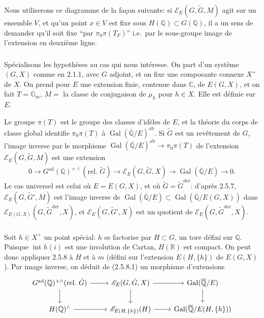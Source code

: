 \documentclass[12pt,a4paper]{article}
\theoremstyle{plain}
\theoremstyle{definition}
\theoremstyle{remark}
\DeclareMathOperator{\Gal}{Gal}
\DeclareMathOperator{\Int}{int}
\newcommand{\QQ}{\mathbb{Q}}
\newcommand{\RR}{\mathbb{R}}
\newcommand{\CC}{\mathbb{C}}
\newcommand{\Gm}{\mathbb{G}}
\begin{document}
Nous utiliserons ce diagramme de la fa\c{c}on suivante: si $\mathscr{E}_E(G,\tilde{G},M)$ agit sur un ensemble $V$, et qu'un point $x \in V$ est fixe sous $H(\QQ) \subset G(\QQ)$, il a un sens de demander qu'il soit fixe ``par $\pi_0\pi(T_F)$'' i.e.~par le sous-groupe image de l'extension en deuxi\`eme ligne.

\subsubsection{}

Sp\'ecialisons les hypoth\`eses au cas qui nous int\'eresse. On part d'un syst\`eme $(G,X)$ comme en 2.1.1, avec $G$ adjoint, et on fixe une composante connexe $X^+$ de $X$. On prend pour $E$ une extension finie, contenue dans $\CC$, de $E(G,X)$, et on fait $T = \Gm_m$, $M =$ la classe de conjugaison de $\mu_h$ pour $h \in X$. Elle est d\'efinie sur $E$.

Le groupe $\pi(T)$ est le groupe des classes d'id\`eles de $E$, et la th\'eorie du corps de classe global identifie $\pi_0\pi(T)$ \`a $\Gal(\overline{\QQ}/E)^{\text{ab}}$. Si $\tilde{G}$ est un rev\^etement de $G$, l'image inverse par le morphisme $\Gal(\overline{\QQ}/E)^{\text{ab}} \to \pi_0\pi(T)$ de l'extension $\mathscr{E}_E(G,\tilde{G},M)$ est une extension
\begin{equation}\label{eq:2.5.9.1}
0 \to G^{\text{ad}}(\QQ)^{+\wedge}(\text{rel.~}\tilde{G}) \to \mathscr{E}_E(G,\tilde{G},X) \to \Gal(\overline{\QQ}/E) \to 0.
\end{equation}
Le cas universel est celui o\`u $E = E(G,X)$, et o\`u $\tilde{G} = \tilde{G}^{\text{der}}$: d'apr\`es 2.5.7, $\mathscr{E}_E(G,\tilde{G}',M)$ est l'image inverse de $\Gal(\overline{\QQ}/E) \subset \Gal(\overline{\QQ}/E(G,X))$ dans $\mathscr{E}_{E(G,X)}(G,\tilde{G}^{\text{der}},X)$, et $\mathscr{E}_E(G,\tilde{G}',X)$ est un quotient de $\mathscr{E}_E(G,\tilde{G}^{\text{der}},X)$.

\subsubsection{}

Soit $h \in X^+$ un point sp\'ecial: $h$ se factorise par $H \subset G$, un tore d\'efini sur $\QQ$. Puisque $\Int h(i)$ est une involution de Cartan, $H(\RR)$ est compact. On peut donc appliquer 2.5.8 \`a $H$ et \`a $m$ (d\'efini sur l'extension $E(H,\{h\})$ de $E(G,X)$). Par image inverse, on d\'eduit de (2.5.8.1) un morphisme d'extensions
\begin{equation}\label{eq:2.5.10.1}
\begin{tikzcd}
G^{\text{ad}}(\QQ)^{+\wedge}(\text{rel.~}\tilde{G}) \arrow[r] \arrow[d] & \mathscr{E}_E(G,\tilde{G},X) \arrow[r] \arrow[d] & \Gal(\overline{\QQ}/E) \arrow[d] \\
H(\QQ)^{\wedge} \arrow[r] & \mathscr{E}_{E(H,\{h\})}(H) \arrow[r] & \Gal(\overline{\QQ}/E(H,\{h\}))
\end{tikzcd}
\end{equation}
\end{document}
